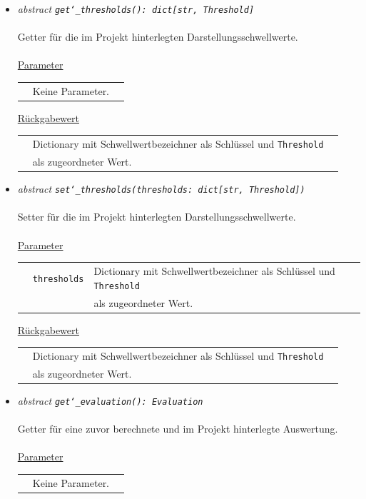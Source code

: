 \documentclass{article}
\begin{document}
\begin{itemize}
\begin{itemize}
\item \textit{\flqq{}abstract\frqq} \texttt{\textit{get\char`_thresholds(): dict[str, Threshold]}}\\\\
Getter für die im Projekt hinterlegten Darstellungsschwellwerte.
\\\\
\underline{Parameter}\\
\begin{tabular}{lll}
 & Keine Parameter.\\
\end{tabular}

\underline{Rückgabewert}\\
\begin{tabular}{lll}
 & Dictionary mit Schwellwertbezeichner als Schlüssel und \texttt{Threshold}\\
 & als zugeordneter Wert.\\
\end{tabular}


\item \textit{\flqq{}abstract\frqq} \texttt{\textit{set\char`_thresholds(thresholds: dict[str, Threshold])}}\\\\
Setter für die im Projekt hinterlegten Darstellungsschwellwerte.
\\\\
\underline{Parameter}\\
\begin{tabular}{lll}
 & \texttt{thresholds} & Dictionary mit Schwellwertbezeichner als Schlüssel und \texttt{Threshold}\\
 && als zugeordneter Wert.\\
\end{tabular}

\underline{Rückgabewert}\\
\begin{tabular}{lll}
 & Dictionary mit Schwellwertbezeichner als Schlüssel und \texttt{Threshold}\\
 & als zugeordneter Wert.\\
\end{tabular}


\item \textit{\flqq{}abstract\frqq} \texttt{\textit{get\char`_evaluation(): Evaluation}}\\\\
Getter für eine zuvor berechnete und im Projekt hinterlegte Auswertung.
\\\\
\underline{Parameter}\\
\begin{tabular}{lll}
 & Keine Parameter.\\
\end{tabular}


\end{itemize}
\end{itemize}
\end{document}
